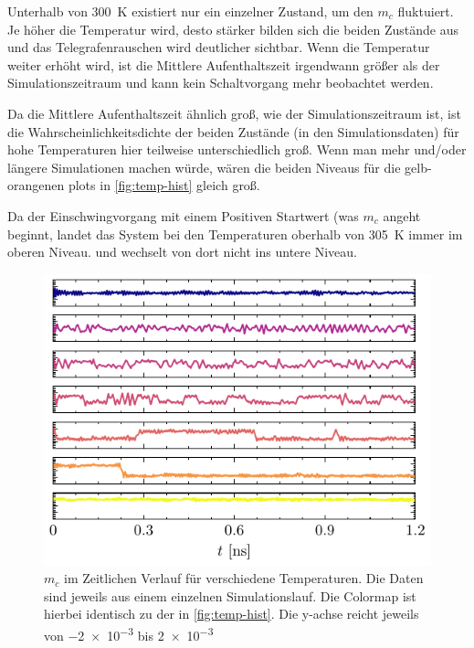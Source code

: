 \documentclass[main.tex]{subfiles}
\begin{document}
Unterhalb von \SI{300}{\kelvin} existiert nur ein einzelner Zustand, um den \(m_c\) fluktuiert. Je höher die Temperatur wird, desto stärker bilden sich die beiden Zustände aus und das Telegrafenrauschen wird deutlicher sichtbar. Wenn die Temperatur weiter erhöht wird, ist die Mittlere Aufenthaltszeit irgendwann größer als der Simulationszeitraum und kann kein Schaltvorgang mehr beobachtet werden.

Da die Mittlere Aufenthaltszeit ähnlich groß, wie der Simulationszeitraum ist, ist die Wahrscheinlichkeitsdichte der beiden Zustände (in den Simulationsdaten) für hohe Temperaturen hier teilweise unterschiedlich groß. Wenn man mehr und/oder längere Simulationen machen würde, wären die beiden Niveaus für die gelb-orangenen plots in \cref{fig:temp-hist} gleich groß.

Da der Einschwingvorgang mit einem Positiven Startwert (was \(m_c\) angeht beginnt, landet das System bei den Temperaturen oberhalb von \SI{305}{\kelvin} immer im oberen Niveau. und wechselt von dort nicht ins untere Niveau. 

\begin{figure}[H]
    \centering
    \includegraphics{bilder/plots/temp_comparison_long/mc_time.pdf}
    \caption{\(m_c\) im Zeitlichen Verlauf für verschiedene Temperaturen. Die Daten sind jeweils aus einem einzelnen Simulationslauf. Die Colormap ist hierbei identisch zu der in \cref{fig:temp-hist}. Die y-achse reicht jeweils von \num{-2e-3} bis \num{+2e-3}}\label{fig:temp-time}
\end{figure}
\end{document}
